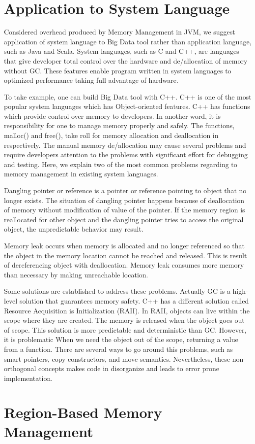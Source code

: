 \section{Application to System Language}
\label{sec:history}
Considered overhead produced by Memory Management in JVM, we suggest application of system language to Big Data tool rather than application language, such as Java and Scala. 
System languages, such as C and C++, are languages that give developer total control over the hardware and de/allocation of memory without GC. 
These features enable program written in system languages to optimized performance taking full advantage of hardware. 

To take example, one can build Big Data tool with C++. C++ is one of the most popular system languages which has Object-oriented features. 
C++ has functions which provide control over memory to developers. In another word, it is responsibility for one to manage memory properly and safely. 
The functions, malloc() and free(), take roll for memory allocation and deallocation in respectively. The manual memory de/allocation may cause several problems and require developers 
attention to the problems with significant effort for debugging and testing. Here, we explain two of the most common problems regarding to memory management in existing system languages.

Dangling pointer or reference is a pointer or reference pointing to object that no longer exists. The situation of dangling pointer happens 
because of deallocation of memory without modification of value of the pointer. 
If the memory region is reallocated for other object and the dangling pointer tries to access the original object, the unpredictable behavior may result. 

Memory leak occurs when memory is allocated and no longer referenced so that the object in the memory location cannot be reached and released.
This is result of dereferencing object with deallocation. Memory leak consumes more memory than necessary by making unreachable location.

Some solutions are established to address these problems. Actually GC is a high-level solution that guarantees memory safety. 
C++ has a different solution called Resource Acquisition is Initialization (RAII). In RAII, objects can live within the scope where they are created. 
The memory is released when the object goes out of scope. This solution is more predictable and deterministic than GC. 
However, it is problematic When we need the object out of the scope, returning a value from a function. 
There are several ways to go around this problems, such as smart pointers, copy constructors, and move semantics. 
Nevertheless, these non-orthogonal concepts makes code in disorganize and leads to error prone implementation. 

\section{Region-Based Memory Management}
\label{sec:history}

